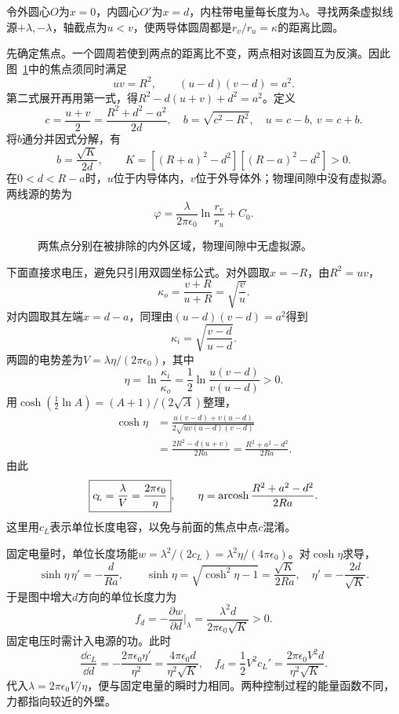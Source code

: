 \begin{solution}
令外圆心$O$为$x=0$，内圆心$O'$为$x=d$，内柱带电量每长度为$\lambda$。寻找两条虚拟线源$+\lambda,-\lambda$，轴截点为$u<v$，使两导体圆周都是$r_v/r_u=\kappa$的距离比圆。

先确定焦点。一个圆周若使到两点的距离比不变，两点相对该圆互为反演。因此图~\ref{fig:es3-e8-s}中的焦点须同时满足
\[uv=R^2,\qquad(u-d)(v-d)=a^2.
\]
第二式展开再用第一式，得$R^2-d(u+v)+d^2=a^2$。定义
\[c=\frac{u+v}{2}=\frac{R^2+d^2-a^2}{2d},\quad
b=\sqrt{c^2-R^2},\quad u=c-b,\ v=c+b.
\]
将$b$通分并因式分解，有
\[b=\frac{\sqrt K}{2d},\qquad
K=[(R+a)^2-d^2][(R-a)^2-d^2]>0.
\]
在$0<d<R-a$时，$u$位于内导体内，$v$位于外导体外；物理间隙中没有虚拟源。两线源的势为
\[\varphi=\frac\lambda{2\pi\epsilon_0}\ln\frac{r_v}{r_u}+C_0.
\]
\begin{figure}[H]\centering
{}
\caption{两焦点分别在被排除的内外区域，物理间隙中无虚拟源。}\label{fig:es3-e8-s}
\end{figure}
下面直接求电压，避免只引用双圆坐标公式。对外圆取$x=-R$，由$R^2=uv$，
\[\kappa_o=\frac{v+R}{u+R}=\sqrt{\frac vu}.
\]
对内圆取其左端$x=d-a$，同理由$(u-d)(v-d)=a^2$得到
\[\kappa_i=\sqrt{\frac{v-d}{u-d}}.
\]
两圆的电势差为$V=\lambda\eta/(2\pi\epsilon_0)$，其中
\[\eta=\ln\frac{\kappa_i}{\kappa_o}
=\frac12\ln\frac{u(v-d)}{v(u-d)}>0.
\]
用$\cosh(\tfrac12\ln A)=(A+1)/(2\sqrt A)$整理，
\[\begin{aligned}
\cosh\eta
&=\frac{u(v-d)+v(u-d)}{2\sqrt{uv(u-d)(v-d)}}\\
&=\frac{2R^2-d(u+v)}{2Ra}
=\frac{R^2+a^2-d^2}{2Ra}.
\end{aligned}\]
由此
\[\boxed{c_{\!L}=\frac\lambda V=\frac{2\pi\epsilon_0}{\eta}},\qquad
\eta=\operatorname{arcosh}\frac{R^2+a^2-d^2}{2Ra}.
\]
这里用$c_{\!L}$表示单位长度电容，以免与前面的焦点中点$c$混淆。

固定电量时，单位长度场能$w=\lambda^2/(2c_{\!L})=\lambda^2\eta/(4\pi\epsilon_0)$。对$\cosh\eta$求导，
\[\sinh\eta\,\eta'=-\frac d{Ra},\qquad
\sinh\eta=\sqrt{\cosh^2\eta-1}=\frac{\sqrt K}{2Ra},
\quad\eta'=-\frac{2d}{\sqrt K}.
\]
于是图中增大$d$方向的单位长度力为
\[\boxed{f_d=-\frac{\partial w}{\partial d}\bigg|_\lambda
=\frac{\lambda^2d}{2\pi\epsilon_0\sqrt K}}>0.
\]
固定电压时需计入电源的功。此时
\[\frac{\dd c_{\!L}}{\dd d}=-\frac{2\pi\epsilon_0\eta'}{\eta^2}
=\frac{4\pi\epsilon_0d}{\eta^2\sqrt K},\quad
f_d=\frac12V^2c_{\!L}'=\frac{2\pi\epsilon_0V^2d}{\eta^2\sqrt K}.
\]
代入$\lambda=2\pi\epsilon_0V/\eta$，便与固定电量的瞬时力相同。两种控制过程的能量函数不同，力都指向较近的外壁。


\end{solution}
